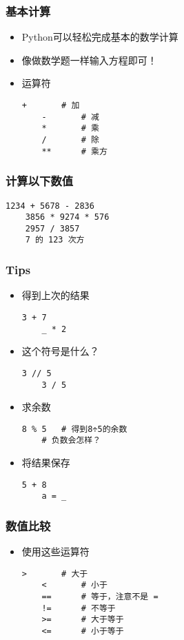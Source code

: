 \begin{frame} [fragile]
	\frametitle{基本计算}
	\begin{itemize}
	\item Python可以轻松完成基本的数学计算
	\item 像做数学题一样输入方程即可！
	\item 运算符
	\begin{lstlisting}[style=pythonstyle, gobble=4, texcl]
	+		# 加
	-		# 减
	*		# 乘
	/		# 除
	**		# 乘方
	\end{lstlisting}
	\end{itemize}
\end{frame}

\begin{frame} [fragile]
	\frametitle{计算以下数值}
	\begin{lstlisting}[style=pythonstyle, gobble=4,
						basicstyle=\linespread{2}\ttfamily]
	1234 + 5678 - 2836
	3856 * 9274 * 576
	2957 / 3857
	7 的 123 次方
	\end{lstlisting}
\end{frame}

\begin{frame} [fragile]
	\frametitle{Tips}
	\begin{itemize}
	\item 得到上次的结果
	\begin{lstlisting}[style=pythonstyle, gobble=4]
	3 + 7
	_ * 2
	\end{lstlisting}
	\item 这个符号是什么？
	\begin{lstlisting}[style=pythonstyle, gobble=4]
	3 // 5
	3 / 5
	\end{lstlisting}
	\item 求余数
	\begin{lstlisting}[style=pythonstyle, gobble=4, texcl]
	8 % 5   # 得到8÷5的余数
	# 负数会怎样？
	\end{lstlisting}
	\item 将结果保存
	\begin{lstlisting}[style=pythonstyle, gobble=4]
	5 + 8
	a = _
	\end{lstlisting}
	\end{itemize}
\end{frame}

\begin{frame} [fragile]
	\frametitle{数值比较}
	\begin{itemize}
	\item 使用这些运算符
	\begin{lstlisting}[style=pythonstyle, gobble=4, texcl,
						basicstyle=\linespread{1.5}\ttfamily]
	>		# 大于
	<		# 小于
	==		# 等于，注意不是 =
	!=		# 不等于
	>=		# 大于等于
	<=		# 小于等于
	\end{lstlisting}
	\end{itemize}
\end{frame}

